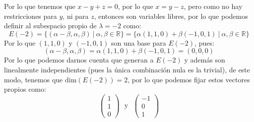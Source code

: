 \begin{itemize}
\begin{itemize}
    Por lo que tenemos que $x-y+z=0$, por lo que $x=y-z$, pero como no hay restricciones para $y$, ni para $z$, entonces son variables libres, por lo que podemos definir al subespacio propio de $\lambda=-2$ como:
    \[E(-2)=\{(\alpha-\beta,\alpha,\beta)~|~\alpha,\beta\in\mathbb{R}\}=\{\alpha(1,1,0)+\beta(-1,0,1)~|~\alpha,\beta\in\mathbb{R}\}\]
    Por lo que $(1,1,0)$ y $(-1,0,1)$ son una base para $E(-2)$, pues:
    \[(\alpha-\beta,\alpha,\beta)=\alpha(1,1,0)+\beta(-1,0,1)=(0,0,0)\]
    Por lo que podemos darnos cuenta que generan a $E(-2)$ y adem\'as son linealmente independientes (pues la \'unica combinaci\'on nula es la trivial), de este modo, tenemos que $\text{dim}(E(-2))=2$, por lo que podemos fijar estos vectores propios como:
    $$\begin{pmatrix}1\\ 1\\ 0\end{pmatrix}~~~\text{y}~~~\begin{pmatrix}-1\\ 0\\ 1\end{pmatrix}$$
    

\end{itemize}
\end{itemize}
